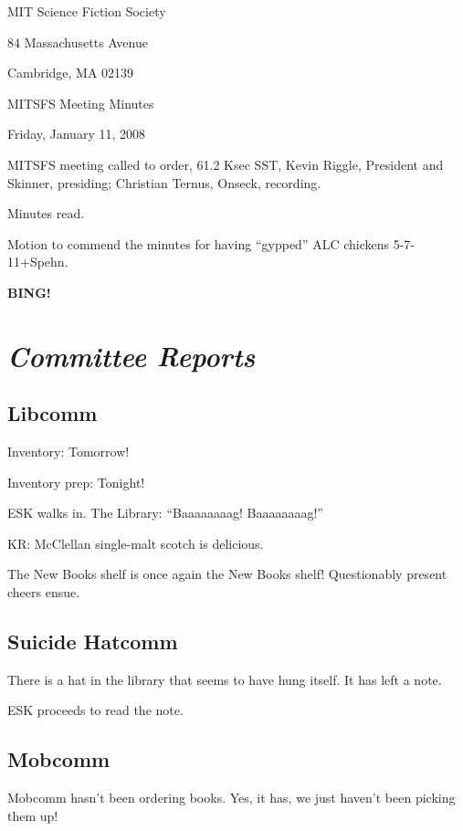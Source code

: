 \documentclass[10pt]{article}
\newcommand{\bing}{{\bf BING!} }
\newcommand{\goto}[1]{\bing \vskip 12pt \section*{{\em{#1}}}}
\begin{document}
\begin{center}

MIT Science Fiction Society

84 Massachusetts Avenue

Cambridge, MA 02139

\vspace{12pt}

MITSFS Meeting Minutes

Friday, January 11, 2008

\end{center}

\vspace{18pt}

\setlength{\parskip}{6pt}

\noindent
MITSFS meeting called to order, 61.2 Ksec SST,
Kevin Riggle, President and Skinner, presiding; Christian Ternus, Onseck, recording.

Minutes read.

Motion to commend the minutes for having ``gypped'' ALC chickens 5-7-11+Spehn.

\BING

\goto{Committee Reports}

\subsection*{Libcomm}

Inventory: Tomorrow!

Inventory prep: Tonight!

ESK walks in.  The Library:  ``Baaaaaaaag!  Baaaaaaaag!''

KR:  McClellan single-malt scotch is delicious.

The New Books shelf is once again the New Books shelf!  Questionably
present cheers ensue.

\subsection*{Suicide Hatcomm}

There is a hat in the library that seems to have hung itself.  It has left a note.

ESK proceeds to read the note.

\subsection*{Mobcomm}

Mobcomm hasn't been ordering books.  Yes, it has, we just haven't been picking them up!
\end{document}
